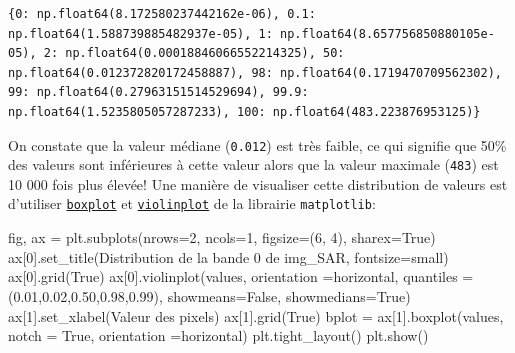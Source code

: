 \documentclass[
  french,
  11pt,
  letterpaper,
  open=any,
  twoside=false,
  french]{scrbook}
\newenvironment{Shaded}{\begin{snugshade}}{\end{snugshade}}
\newcommand{\DecValTok}[1]{\textcolor[rgb]{0.68,0.00,0.00}{#1}}
\newcommand{\FloatTok}[1]{\textcolor[rgb]{0.68,0.00,0.00}{#1}}
\newcommand{\NormalTok}[1]{\textcolor[rgb]{0.00,0.23,0.31}{#1}}
\newcommand{\OperatorTok}[1]{\textcolor[rgb]{0.37,0.37,0.37}{#1}}
\newcommand{\StringTok}[1]{\textcolor[rgb]{0.13,0.47,0.30}{#1}}
\newcommand{\VariableTok}[1]{\textcolor[rgb]{0.07,0.07,0.07}{#1}}
\begin{document}
\begin{verbatim}
{0: np.float64(8.172580237442162e-06), 0.1: np.float64(1.588739885482937e-05), 1: np.float64(8.657756850880105e-05), 2: np.float64(0.00018846066552214325), 50: np.float64(0.012372820172458887), 98: np.float64(0.1719470709562302), 99: np.float64(0.27963151514529694), 99.9: np.float64(1.5235805057287233), 100: np.float64(483.223876953125)}
\end{verbatim}

On constate que la valeur médiane (\texttt{0.012}) est très faible, ce
qui signifie que 50\% des valeurs sont inférieures à cette valeur alors
que la valeur maximale (\texttt{483}) est 10 000 fois plus élevée! Une
manière de visualiser cette distribution de valeurs est d'utiliser
\href{https://matplotlib.org/stable/api/_as_gen/matplotlib.pyplot.boxplot.html}{\texttt{boxplot}}
et
\href{https://matplotlib.org/stable/api/_as_gen/matplotlib.pyplot.violinplot.html}{\texttt{violinplot}}
de la librairie \texttt{matplotlib}:

\begin{Shaded}
\begin{Highlighting}[]
\NormalTok{fig, ax }\OperatorTok{=}\NormalTok{ plt.subplots(nrows}\OperatorTok{=}\DecValTok{2}\NormalTok{, ncols}\OperatorTok{=}\DecValTok{1}\NormalTok{, figsize}\OperatorTok{=}\NormalTok{(}\DecValTok{6}\NormalTok{, }\DecValTok{4}\NormalTok{), sharex}\OperatorTok{=}\VariableTok{True}\NormalTok{)}
\NormalTok{ax[}\DecValTok{0}\NormalTok{].set\_title(}\StringTok{\textquotesingle{}Distribution de la bande 0 de img\_SAR\textquotesingle{}}\NormalTok{, fontsize}\OperatorTok{=}\StringTok{\textquotesingle{}small\textquotesingle{}}\NormalTok{)}
\NormalTok{ax[}\DecValTok{0}\NormalTok{].grid(}\VariableTok{True}\NormalTok{)}
\NormalTok{ax[}\DecValTok{0}\NormalTok{].violinplot(values, orientation  }\OperatorTok{=}\StringTok{\textquotesingle{}horizontal\textquotesingle{}}\NormalTok{, }
\NormalTok{                 quantiles }\OperatorTok{=}\NormalTok{(}\FloatTok{0.01}\NormalTok{,}\FloatTok{0.02}\NormalTok{,}\FloatTok{0.50}\NormalTok{,}\FloatTok{0.98}\NormalTok{,}\FloatTok{0.99}\NormalTok{),}
\NormalTok{                  showmeans}\OperatorTok{=}\VariableTok{False}\NormalTok{,}
\NormalTok{                  showmedians}\OperatorTok{=}\VariableTok{True}\NormalTok{)}
\NormalTok{ax[}\DecValTok{1}\NormalTok{].set\_xlabel(}\StringTok{\textquotesingle{}Valeur des pixels\textquotesingle{}}\NormalTok{)}
\NormalTok{ax[}\DecValTok{1}\NormalTok{].grid(}\VariableTok{True}\NormalTok{)}
\NormalTok{bplot }\OperatorTok{=}\NormalTok{ ax[}\DecValTok{1}\NormalTok{].boxplot(values, notch }\OperatorTok{=} \VariableTok{True}\NormalTok{, orientation  }\OperatorTok{=}\StringTok{\textquotesingle{}horizontal\textquotesingle{}}\NormalTok{)}
\NormalTok{plt.tight\_layout()}
\NormalTok{plt.show()}
\end{Highlighting}
\end{Shaded}
\end{document}
